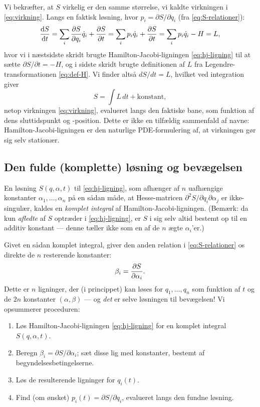 Vi bekræfter, at $S$ virkelig er den samme størrelse, vi kaldte
virkningen i \eqref{eq:virkning}. Langs en faktisk løsning, hvor
$p_i=\partial S/\partial q_i$ (fra \eqref{eq:S-relationer}):
\begin{equation}
  \dv{S}{t} = \sum_i\pdv{S}{q_i}\dot q_i + \pdv{S}{t}
  = \sum_i p_i\dot q_i + \pdv{S}{t}
  = \sum_i p_i\dot q_i - H = L,
\end{equation}
hvor vi i næstsidste skridt brugte Hamilton-Jacobi-ligningen
\eqref{eq:hj-ligning} til at sætte $\partial S/\partial t=-H$, og i
sidste skridt brugte definitionen af $L$ fra Legendre-transformationen
\eqref{eq:def-H}. Vi finder altså $dS/dt = L$, hvilket ved integration
giver
\begin{equation}
  S = \int L\,dt + \text{konstant},
\end{equation}
netop virkningen \eqref{eq:virkning}, evalueret langs den faktiske
bane, som funktion af dens sluttidspunkt og -position. Dette er ikke
en tilfældig sammenfald af navne: Hamilton-Jacobi-ligningen er den
naturlige PDE-formulering af, at virkningen gør sig selv stationær.

\subsection{Den fulde (komplette) løsning og bevægelsen}

En løsning $S(q,\alpha,t)$ til \eqref{eq:hj-ligning}, som afhænger af
$n$ uafhængige konstanter $\alpha_1,\dots,\alpha_n$ på en sådan måde,
at Hesse-matricen $\partial^2S/\partial q_i\partial\alpha_j$ er
ikke-singulær, kaldes en \emph{komplet integral} af
Hamilton-Jacobi-ligningen. (Bemærk: da kun \emph{afledte} af $S$
optræder i \eqref{eq:hj-ligning}, er $S$ i sig selv altid bestemt op
til en additiv konstant — denne tæller ikke som en af de $n$ ægte
$\alpha_i$'er.)

Givet en sådan komplet integral, giver den anden relation i
\eqref{eq:S-relationer} os direkte de $n$ resterende konstanter:
\begin{equation}
  \beta_i = \pdv{S}{\alpha_i}(q,\alpha,t).
  \label{eq:beta-relation}
\end{equation}
Dette er $n$ ligninger, der (i princippet) kan løses for
$q_1,\dots,q_n$ som funktion af $t$ og de $2n$ konstanter
$(\alpha,\beta)$ — og \emph{det} er selve løsningen til bevægelsen! Vi
opsummerer proceduren:

\begin{enumerate}
  \item Løs Hamilton-Jacobi-ligningen \eqref{eq:hj-ligning} for en
        komplet integral $S(q,\alpha,t)$.
  \item Beregn $\beta_i=\partial S/\partial\alpha_i$; sæt disse lig
        med konstanter, bestemt af begyndelsesbetingelserne.
  \item Løs de resulterende ligninger for $q_i(t)$.
  \item Find (om ønsket) $p_i(t)=\partial S/\partial q_i$, evalueret
        langs den fundne løsning.
\end{enumerate}

